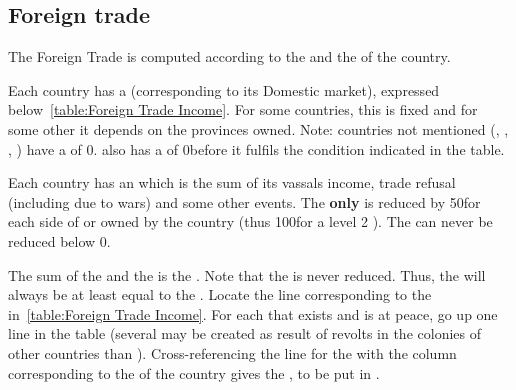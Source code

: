 \subsection{Foreign trade}\label{chIncomes:Foreign Trade}
\aparag The Foreign Trade is computed according to the  and the \FTI of the country.

\aparag Each country has a  (corresponding to
its Domestic market), expressed below~\ref{table:Foreign Trade
  Income}.
\bparag For some countries, this is fixed and for some other it depends
on the provinces owned.
\bparag Note: countries not mentioned (\POL, \POR, \PRU, \VEN) have a
 of 0\ducats. \RUS also has a  of 0\ducats before it fulfils the condition indicated
in the table.

\aparag Each country has an  which is the sum
of its vassals income, trade refusal (including due to wars) and some
other events.
\bparag The  \textbf{only} is reduced by
50\ducats for each side of  or  \MNU owned by the
country (thus 100\ducats for a level 2 \MNU).
\bparag The  can never be reduced below 0.

\aparag The sum of the  and the  is the .
\bparag Note that the  is never
reduced. Thus, the  will always be at least equal
to the .
\bparag Locate the line corresponding to the 
in~\ref{table:Foreign Trade Income}.
\bparag For each  that exists and is at peace, go up one
line in the table (several  may be created as result of
revolts in the colonies of other countries than \ANG).
\bparag Cross-referencing the line for the  with
the column corresponding to the \FTI of the country gives the
, to be put in .

